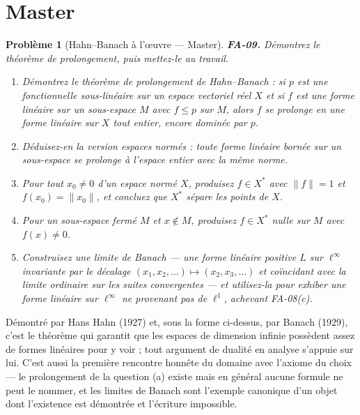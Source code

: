 \documentclass[11pt]{article}
\newtheorem{problem}{Problème}
\begin{document}
\bigskip


\section*{Master}

\begin{problem}[{Hahn--Banach à l'\oe{}uvre --- Master}]
\textbf{FA-09.} Démontrez le théorème de prolongement, puis mettez-le au travail.
\begin{enumerate}
\item[(a)] Démontrez le théorème de prolongement de Hahn--Banach : si $ p $ est une fonctionnelle
sous-linéaire sur un espace vectoriel réel $ X $ et si $ f $ est une forme linéaire sur un
sous-espace $ M $ avec $ f \le p $ sur $ M $, alors $ f $ se prolonge en une forme linéaire
sur $ X $ tout entier, encore dominée par $ p $.
\item[(b)] Déduisez-en la version \og{} espaces normés \fg{} : toute forme linéaire bornée sur un sous-espace se
prolonge à l'espace entier avec la même norme.
\item[(c)] Pour tout $ x_0 \ne 0 $ d'un espace normé $ X $, produisez $ f \in X^{*} $ avec
$ \|f\| = 1 $ et $ f(x_0) = \|x_0\| $, et concluez que $ X^{*} $ sépare les points de
$ X $.
\item[(d)] Pour un sous-espace fermé $ M $ et $ x \notin M $, produisez $ f \in X^{*} $ nulle sur
$ M $ avec $ f(x) \ne 0 $.
\item[(e)] Construisez une \textit{limite de Banach} --- une forme linéaire positive $ L $ sur
$ \ell^\infty $ invariante par le décalage
$ (x_1, x_2, \dots) \mapsto (x_2, x_3, \dots) $ et coïncidant avec la limite ordinaire sur les
suites convergentes --- et utilisez-la pour exhiber une forme linéaire sur $ \ell^\infty $ ne
provenant pas de $ \ell^1 $, achevant FA-08(c).
\end{enumerate}

\end{problem}

\noindent Démontré par Hans Hahn (1927) et, sous la forme ci-dessus, par Banach (1929), c'est le
théorème qui garantit que les espaces de dimension infinie possèdent assez de formes linéaires pour y
voir ; tout argument de dualité en analyse s'appuie sur lui. C'est aussi la première rencontre honnête du
domaine avec l'axiome du choix --- le prolongement de la question (a) existe mais en général aucune formule
ne peut le nommer, et les limites de Banach sont l'exemple canonique d'un objet dont l'existence est
démontrée et l'écriture impossible.
\end{document}
